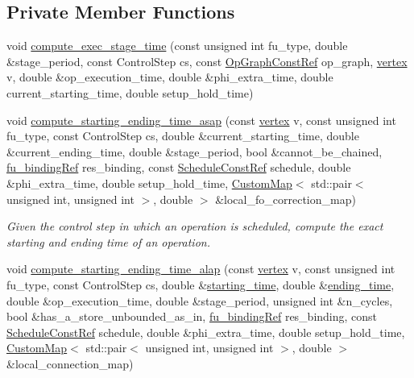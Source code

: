 \subsection*{Private Member Functions}
\begin{DoxyCompactItemize}
\item 
void \hyperlink{classparametric__list__based_a054abcf6ebfca65a3c67458cb77d7e63}{compute\+\_\+exec\+\_\+stage\+\_\+time} (const unsigned int fu\+\_\+type, double \&stage\+\_\+period, const Control\+Step cs, const \hyperlink{op__graph_8hpp_a9a0b240622c47584bee6951a6f5de746}{Op\+Graph\+Const\+Ref} op\+\_\+graph, \hyperlink{graph_8hpp_abefdcf0544e601805af44eca032cca14}{vertex} v, double \&op\+\_\+execution\+\_\+time, double \&phi\+\_\+extra\+\_\+time, double current\+\_\+starting\+\_\+time, double setup\+\_\+hold\+\_\+time)
\item 
void \hyperlink{classparametric__list__based_a02e229e9aa133401c91ddf50fdd78604}{compute\+\_\+starting\+\_\+ending\+\_\+time\+\_\+asap} (const \hyperlink{graph_8hpp_abefdcf0544e601805af44eca032cca14}{vertex} v, const unsigned int fu\+\_\+type, const Control\+Step cs, double \&current\+\_\+starting\+\_\+time, double \&current\+\_\+ending\+\_\+time, double \&stage\+\_\+period, bool \&cannot\+\_\+be\+\_\+chained, \hyperlink{fu__binding_8hpp_a619181df8ab98d7b7e17de58ac44b065}{fu\+\_\+binding\+Ref} res\+\_\+binding, const \hyperlink{schedule_8hpp_a85e4dea8a1611026193d8ca13fc5a260}{Schedule\+Const\+Ref} schedule, double \&phi\+\_\+extra\+\_\+time, double setup\+\_\+hold\+\_\+time, \hyperlink{custom__map_8hpp_a18ca01763abbe3e5623223bfe5aaac6b}{Custom\+Map}$<$ std\+::pair$<$ unsigned int, unsigned int $>$, double $>$ \&local\+\_\+fo\+\_\+correction\+\_\+map)
\begin{DoxyCompactList}\small\item\em Given the control step in which an operation is scheduled, compute the exact starting and ending time of an operation. \end{DoxyCompactList}\item 
void \hyperlink{classparametric__list__based_aea554a314bf6dd38be5cc93a617cea30}{compute\+\_\+starting\+\_\+ending\+\_\+time\+\_\+alap} (const \hyperlink{graph_8hpp_abefdcf0544e601805af44eca032cca14}{vertex} v, const unsigned int fu\+\_\+type, const Control\+Step cs, double \&\hyperlink{classparametric__list__based_a48af95dd945034fdad7f1f0d5502c13c}{starting\+\_\+time}, double \&\hyperlink{classparametric__list__based_a0b92fb6107c2c1bdb966db10baf57a30}{ending\+\_\+time}, double \&op\+\_\+execution\+\_\+time, double \&stage\+\_\+period, unsigned int \&n\+\_\+cycles, bool \&has\+\_\+a\+\_\+store\+\_\+unbounded\+\_\+as\+\_\+in, \hyperlink{fu__binding_8hpp_a619181df8ab98d7b7e17de58ac44b065}{fu\+\_\+binding\+Ref} res\+\_\+binding, const \hyperlink{schedule_8hpp_a85e4dea8a1611026193d8ca13fc5a260}{Schedule\+Const\+Ref} schedule, double \&phi\+\_\+extra\+\_\+time, double setup\+\_\+hold\+\_\+time, \hyperlink{custom__map_8hpp_a18ca01763abbe3e5623223bfe5aaac6b}{Custom\+Map}$<$ std\+::pair$<$ unsigned int, unsigned int $>$, double $>$ \&local\+\_\+connection\+\_\+map)

\end{DoxyCompactItemize}

